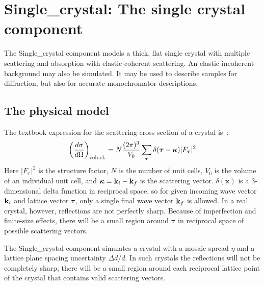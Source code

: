 \section{Single\_crystal: The single crystal component}
\label{s:Single_crystal}

The Single\_crystal component models a thick, flat single crystal with multiple scattering and absorption with elastic coherent scattering. An elastic incoherent background may also be simulated. It may be used to describe samples for diffraction, but also for accurate monochromator descriptions.

\subsection{The physical model}

The textbook expression for the scattering cross-section of a crystal
is~\cite{squires}:
\begin{equation}
\label{eq:sigma_coh_el}
\left(\frac{d\sigma}{d\Omega}\right)_{\rm coh.el.} =
        N\frac{(2\pi)^3}{V_0}\sum_{\boldsymbol{\tau}}
        \delta(\boldsymbol{\tau} - \boldsymbol{\kappa})|F_{\boldsymbol{\tau}}|^2
\end{equation}
Here $|F_{\boldsymbol{\tau}}|^2$ is the structure factor, $N$ is the
number of unit cells, $V_0$ is the volume of an
individual unit cell, and $\boldsymbol{\kappa} = {\bf k}_i - {\bf
  k}_f$ is the scattering vector. $\delta(\boldsymbol{x})$ is a 3-dimensional delta
function in reciprocal space,
so for given incoming wave vector ${\bf k}_i$ and lattice vector
${\boldsymbol{\tau}}$, only a single final wave vector ${\bf k}_f$ is allowed.
In a real crystal, however, reflections are not perfectly sharp. Because
of imperfection and finite-size effects, there will be a small region
around $\boldsymbol{\tau}$ in reciprocal space of possible scattering vectors.

The Single\_crystal component simulates a crystal with a mosaic spread
$\eta$ and a lattice plane spacing uncertainty $\Delta d/d$. In such
crystals the reflections will not be completely sharp;
there will be a small region around each reciprocal lattice point of the
crystal that contains valid scattering vectors.

